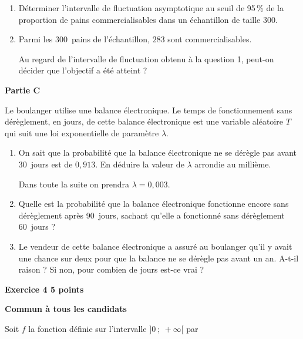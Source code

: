 \documentclass[10pt]{article}
\begin{document}
\medskip
 
\begin{enumerate}
\item Déterminer l'intervalle de fluctuation asymptotique au seuil de 95\,\% de la proportion de pains commercialisables dans un échantillon de taille $300$. 
\item Parmi les $300$~pains de l'échantillon, $283$ sont commercialisables. 

Au regard de l'intervalle de fluctuation obtenu à la question 1, peut-on décider que l'objectif a été atteint ? 
\end{enumerate}

\bigskip
 
\textbf{Partie C}

\medskip 

Le boulanger utilise une balance électronique. Le temps de fonctionnement sans dérèglement, en jours, de cette balance électronique est une variable aléatoire $T$ qui suit une loi exponentielle de paramètre $\lambda$.

\medskip
 
\begin{enumerate}
\item On sait que la probabilité que la balance électronique ne se dérègle pas avant 30~jours est de $0,913$. En déduire la valeur de $\lambda$ arrondie au millième.

\medskip
 
Dans toute la suite on prendra $\lambda = 0,003$.

\medskip
 
\item Quelle est la probabilité que la balance électronique fonctionne encore sans dérèglement après 90~jours, sachant qu'elle a fonctionné sans dérèglement 60~jours ? 
\item Le vendeur de cette balance électronique a assuré au boulanger qu'il y avait une chance sur deux pour que la balance ne se dérègle pas avant un an. A-t-il raison ? Si non, pour combien de jours est-ce vrai ? 
\end{enumerate}

\vspace{0,5cm}

\textbf{Exercice 4 \hfill  5 points}

\textbf{Commun à tous les candidats}

\medskip

Soit $f$ la fonction définie sur l'intervalle $]0~;~+ \infty[$ par 
\end{document}
